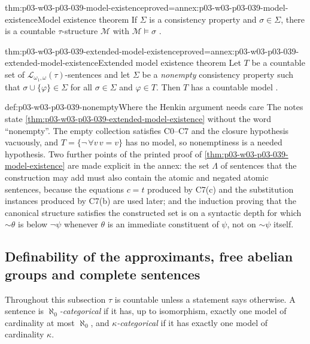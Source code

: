 \begin{hbtheorem}{thm:p03-w03-p03-039-model-existence}{proved=annex:p03-w03-p03-039-model-existence}{Model existence theorem}
If \(\Sigma\) is a consistency property and \(\sigma\in\Sigma\), there is a
countable \(\tau\)-structure \(\mathcal M\) with \(\mathcal M\models\sigma\)
\cite[Thm.~4.6, pp.~40--43]{Marker2014InfinitaryNotes}.
\end{hbtheorem}

\begin{hbtheorem}{thm:p03-w03-p03-039-extended-model-existence}{proved=annex:p03-w03-p03-039-extended-model-existence}{Extended model existence theorem}
Let \(T\) be a countable set of \(\mathcal L_{\omega_1,\omega}(\tau)\)-sentences
and let \(\Sigma\) be a \emph{nonempty} consistency property such that
\(\sigma\cup\{\varphi\}\in\Sigma\) for all \(\sigma\in\Sigma\) and
\(\varphi\in T\). Then \(T\) has a countable model
\cite[Thm.~4.8, p.~43]{Marker2014InfinitaryNotes}.
\end{hbtheorem}

\begin{hbwarning}{def:p03-w03-p03-039-nonempty}{Where the Henkin argument needs care}
The notes state \cref{thm:p03-w03-p03-039-extended-model-existence}
without the word ``nonempty''. The empty collection satisfies C0--C7 and
the closure hypothesis vacuously, and \(T=\{\neg\,\forall v\,v=v\}\) has no
model, so nonemptiness is a needed hypothesis. Two further points of the
printed proof of \cref{thm:p03-w03-p03-039-model-existence} are made
explicit in the annex: the set \(\Lambda\) of sentences that the
construction may add must also contain the atomic and negated atomic
sentences, because the equations \(c=t\) produced by C7(c) and the
substitution instances produced by C7(b) are used later; and the induction
proving that the canonical structure satisfies the constructed set is on a
syntactic depth for which \({\sim}\theta\) is below \(\neg\psi\) whenever
\(\theta\) is an immediate constituent of \(\psi\), not on \({\sim}\psi\)
itself.
\end{hbwarning}

\subsection{Definability of the approximants, free abelian groups and complete sentences}
\label{sec:p03-w03-p03-039-complete-sentences}

Throughout this subsection \(\tau\) is countable unless a statement says
otherwise. A sentence is \emph{\(\aleph_0\)-categorical} if it has, up to
isomorphism, exactly one model of cardinality at most \(\aleph_0\), and
\emph{\(\kappa\)-categorical} if it has exactly one model of cardinality
\(\kappa\).

